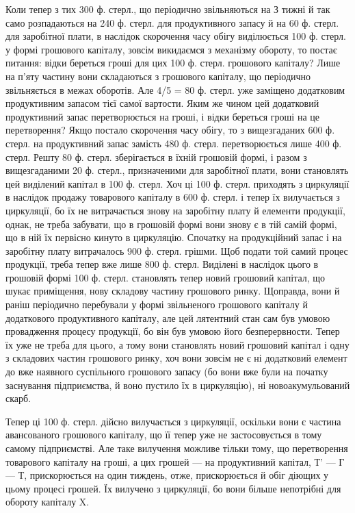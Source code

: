 Коли тепер з тих 300 ф. стерл., що періодично звільняються на З
тижні й так само розпадаються на 240 ф. стерл. для продуктивного запасу
й на 60 ф. стерл. для заробітної плати, в наслідок скорочення часу
обігу виділюється 100 ф. стерл. у формі грошового капіталу, зовсім викидаємся
з механізму обороту, то постає питання: відки береться гроші
для цих 100 ф. стерл. грошового капіталу? Лише на п’яту частину вони
складаються з грошового капіталу, що періодично звільняється в межах
оборотів. Але 4/5 = 80 ф. стерл. уже заміщено додатковим продуктивним
запасом тієї самої вартости. Яким же чином цей додатковий продуктивний
запас перетворюється на гроші, і відки береться гроші на це перетворення?
Якщо постало скорочення часу обігу, то з вищезгаданих 600 ф. стерл.
на продуктивний запас замість 480 ф. стерл. перетворюється лише 400 ф.
стерл. Решту 80 ф. стерл. зберігається в їхній грошовій формі, і
разом з вищезгаданими 20 ф. стерл., призначеними для заробітної плати,
вони становлять цей виділений капітал в 100 ф. стерл. Хоч ці 100 ф.
стерл. приходять з циркуляції в наслідок продажу товарового капіталу в
600 ф. стерл. і тепер їх вилучається з циркуляції, бо їх не витрачається
знову на заробітну плату й елементи продукції, однак, не треба забувати,
що в грошовій формі вони знову є в тій самій формі, що в ній їх
первісно кинуто в циркуляцію. Спочатку на продукційний запас і на заробітну
плату витрачалось 900 ф. стерл. грішми. Щоб подати той
самий процес продукції, треба тепер вже лише 800 ф. стерл. Виділені в
наслідок цього в грошовій формі 100 ф. стерл. становлять тепер новий
грошовий капітал, що шукає приміщення, нову складову частину грошового
ринку. Щоправда, вони й раніш періодично перебували у формі
звільненого грошового капіталу й додаткового продуктивного капіталу,
але цей лятентний стан сам був умовою провадження процесу продукції,
бо він був умовою його безперервности. Тепер їх уже не треба для
цього, а тому вони становлять новий грошовий капітал і одну з складових
частин грошового ринку, хоч вони зовсім не є ні додатковий елемент
до вже наявного суспільного грошового запасу (бо вони вже були
на початку заснування підприємства, й воно пустило їх в циркуляцію),
ні новоакумульований скарб.

Тепер ці 100 ф. стерл. дійсно вилучається з циркуляції, оскільки вони
є частина авансованого грошового капіталу, що її тепер уже не застосовується
в тому самому підприємстві. Але таке вилучення можливе
тільки тому, що перетворення товарового капіталу на гроші, а цих грошей
— на продуктивний капітал, Т' — Г — Т, прискорюється на один тиждень,
отже, прискорюється й обіг діющих у цьому процесі грошей. Їх вилучено
з циркуляції, бо вони більше непотрібні для обороту капіталу X.

